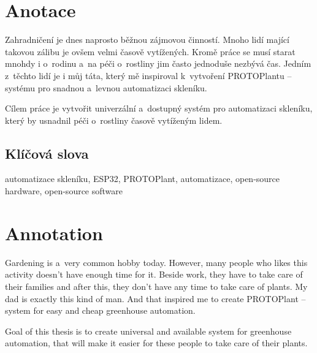 \documentclass{template/socthesis}
\author{Petr Štourač}
\begin{document}
\maketitle



\pagestyle{empty}

\section*{Anotace}
Zahradničení je dnes naprosto běžnou zájmovou činností. Mnoho lidí mající takovou zálibu je ovšem velmi časově vytížených. Kromě práce se musí starat mnohdy i o~rodinu a~na péči o~rostliny jim často jednoduše nezbývá čas. Jedním z~těchto lidí je i můj táta, který mě inspiroval k~vytvoření PROTOPlantu -- systému pro snadnou a~levnou automatizaci skleníku. 

Cílem práce je vytvořit univerzální a~dostupný systém pro automatizaci skleníku, který by usnadnil péči o~rostliny časově vytíženým lidem. 

\subsection*{Klíčová slova}
automatizace skleníku, ESP32, PROTOPlant, automatizace, open-source hardware, open-source software

\vspace{20mm}

\section*{Annotation}
Gardening is a~very common hobby today. However, many people who likes this activity doesn't have enough time for it. 
Beside work, they have to take care of their families and after this, they don't have any time to take care of plants. 
My dad is exactly this kind of man. 
And that inspired me to create PROTOPlant -- system for easy and cheap greenhouse automation.

Goal of this thesis is to create universal and available system for greenhouse automation, that will make it easier for these people to take care of their plants.
\end{document}
